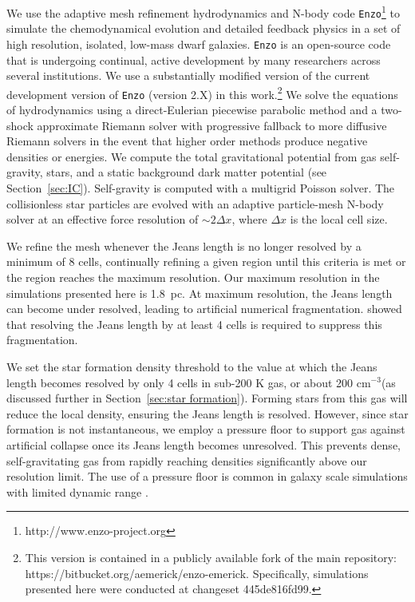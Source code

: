 \documentclass[twocolumn]{aastex61}
\newcommand{\ccunit}{cm$^{-3}$}
\begin{document}
We use the adaptive mesh refinement hydrodynamics and N-body code \texttt{Enzo}\footnote{http://www.enzo-project.org} to simulate the chemodynamical evolution and detailed feedback physics in a set of high resolution, isolated, low-mass dwarf galaxies. \texttt{Enzo} is an open-source code that is undergoing continual, active development by many researchers across several institutions. We use a substantially modified version of the current development version of \texttt{Enzo} (version 2.X) in this work.\footnote{This version is contained in a publicly available fork of the main repository: https://bitbucket.org/aemerick/enzo-emerick. Specifically, simulations presented here were conducted at changeset 445de816fd99.} We solve the equations of hydrodynamics using a direct-Eulerian piecewise parabolic method \citep{ColellaWoodward1984, Bryan1995} and a two-shock approximate Riemann solver with progressive fallback to more diffusive Riemann solvers in the event that higher order methods produce negative densities or energies. We compute the total gravitational potential from gas self-gravity, stars, and a static background dark matter potential (see Section~\ref{sec:IC}). Self-gravity is computed with a multigrid Poisson solver. The collisionless star particles are evolved with an adaptive particle-mesh N-body solver at an effective force resolution of $\sim 2 \Delta x$, where $\Delta x$ is the local cell size. 

     We refine the mesh whenever 
the Jeans length 
    is no longer
resolved by a minimum of 8 cells, continually refining a given region until this criteria is met or the region reaches the maximum resolution. Our maximum resolution in the simulations presented here is 1.8~pc. At maximum resolution, the Jeans length can become under resolved, leading to artificial numerical fragmentation. \citet{Truelove1997} showed that resolving the Jeans length by at least 4 cells is required to suppress this fragmentation.

We set the star formation density threshold to the value at which the Jeans length becomes resolved by only 4 cells in sub-200 K gas, or about 200 \ccunit (as discussed further in Section~\ref{sec:star formation}). Forming stars from this gas will reduce the local density, ensuring the Jeans length is resolved. However, since star formation is not instantaneous, we employ a pressure floor to support gas against artificial collapse once its Jeans length becomes unresolved. This prevents dense, self-gravitating gas from rapidly reaching densities significantly above our resolution limit. The use of a pressure floor is common in galaxy scale simulations with limited dynamic range \citep[e.g][]{Machacek2001,RobertsonKravtsov2008}.
\end{document}
